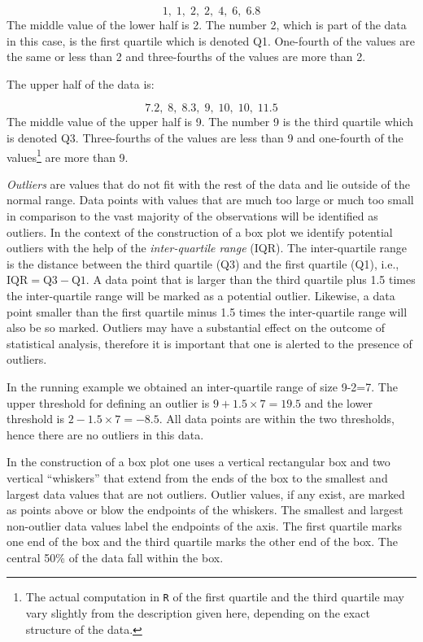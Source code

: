 \documentclass[]{krantz}
\theoremstyle{definition}
\theoremstyle{definition}
\theoremstyle{definition}
\theoremstyle{remark}
\begin{document}
\[1,\;   1,\;   2,\;   2,\;   4,\;   6,\;   6.8\] The middle value of
the lower half is 2. The number 2, which is part of the data in this
case, is the first quartile which is denoted Q1. One-fourth of the
values are the same or less than 2 and three-fourths of the values are
more than 2.

The upper half of the data is:

\[7.2,\;   8,\;   8.3,\;   9,\;   10,\;   10,\;   11.5\] The middle
value of the upper half is 9. The number 9 is the third quartile which
is denoted Q3. Three-fourths of the values are less than 9 and
one-fourth of the values\footnote{The actual computation in \texttt{R} of the first quartile and the third
  quartile may vary slightly from the description given here,
  depending on the exact structure of the data.} are more than 9.

\emph{Outliers} are values that do not fit with the rest of the data and lie
outside of the normal range. Data points with values that are much too
large or much too small in comparison to the vast majority of the
observations will be identified as outliers. In the context of the
construction of a box plot we identify potential outliers with the help
of the \emph{inter-quartile range} (IQR). The inter-quartile range is the
distance between the third quartile (Q3) and the first quartile (Q1),
i.e., \(\mbox{IQR} = \mbox{Q3} - \mbox{Q1}\). A data point that is larger
than the third quartile plus 1.5 times the inter-quartile range will be
marked as a potential outlier. Likewise, a data point smaller than the
first quartile minus 1.5 times the inter-quartile range will also be so
marked. Outliers may have a substantial effect on the outcome of
statistical analysis, therefore it is important that one is alerted to
the presence of outliers.

In the running example we obtained an inter-quartile range of size
9-2=7. The upper threshold for defining an outlier is
\(9+1.5 \times 7 = 19.5\) and the lower threshold is
\(2-1.5 \times 7 = -8.5\). All data points are within the two thresholds,
hence there are no outliers in this data.

In the construction of a box plot one uses a vertical rectangular box
and two vertical ``whiskers'' that extend from the ends of the box to the
smallest and largest data values that are not outliers. Outlier values,
if any exist, are marked as points above or blow the endpoints of the
whiskers. The smallest and largest non-outlier data values label the
endpoints of the axis. The first quartile marks one end of the box and
the third quartile marks the other end of the box. The central 50\% of
the data fall within the box.
\end{document}
